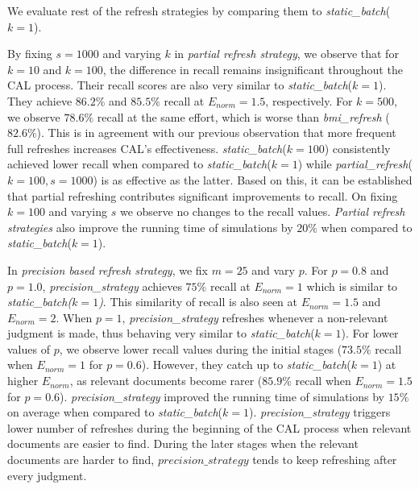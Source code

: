 We evaluate rest of the refresh
strategies by comparing them to \textit{static\_batch}($k = 1$).

By fixing $s=1000$ and varying $k$ in \textit{partial refresh strategy}, we observe
that for $k=10$ and $k=100$, the difference in recall remains insignificant throughout the
CAL process. Their recall scores are also very similar to
\textit{static\_batch}($k = 1$). They achieve $86.2\%$ and $85.5\%$ recall at
$E_{norm} = 1.5$, respectively. For $k=500$, we observe $78.6\%$ recall at the
same effort, which is worse than \textit{bmi\_refresh} ($82.6\%$). This is in
agreement with our previous observation that more frequent full refreshes
increases CAL's effectiveness. \textit{static\_batch}($k=100$) 
consistently achieved lower recall when compared to \textit{static\_batch}($k = 1$) while
\textit{partial\_refresh}($k=100,s=1000$) is as effective as the latter. Based
on this, it can be established that partial refreshing contributes significant
improvements to recall. On fixing $k = 100$ and varying $s$ we observe no changes to the
recall values. \textit{Partial refresh strategies} also improve the running time
of simulations by $20\%$ when compared to \textit{static\_batch}($k = 1$).

In \textit{precision based refresh strategy}, we fix $m = 25$ and vary $p$. For
$p=0.8$ and $p=1.0$, \textit{precision\_strategy} achieves $75\%$ recall at
$E_{norm} = 1$ which is similar to \textit{static\_batch($k = 1$)}. This
similarity of recall is also seen at $E_{norm} = 1.5$ and $E_{norm} = 2$. When
$p=1$, \textit{precision\_strategy} refreshes whenever a non-relevant judgment
is made, thus behaving very similar to \textit{static\_batch}($k = 1$). For
lower values of $p$, we observe lower recall values during the initial stages
($73.5\%$ recall when $E_{norm} = 1$ for $p=0.6$). However, they catch up to
\textit{static\_batch}($k = 1$) at higher $E_{norm}$, as relevant documents
become rarer ($85.9\%$ recall when $E_{norm} = 1.5$ for $p=0.6$).
\textit{precision\_strategy} improved the running time of simulations by $15\%$
on average when compared to \textit{static\_batch}($k = 1$).
\textit{precision\_strategy} triggers lower number of refreshes during the
beginning of the CAL process when relevant documents are easier to find. During
the later stages when the relevant documents are harder to find,
$precision\_strategy$ tends to keep refreshing after every judgment. 

